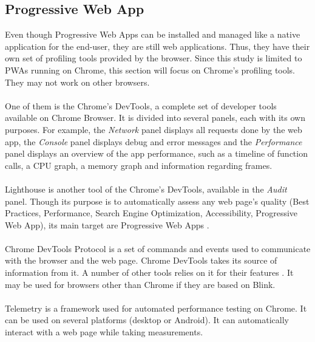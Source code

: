 \documentclass{kththesis}
\begin{document}
\subsection{Progressive Web App}

Even though Progressive Web Apps can be installed and managed like a native application for the end-user, they are still web applications. Thus, they have their own set of profiling tools provided by the browser. Since this study is limited to PWAs running on Chrome, this section will focus on Chrome's profiling tools. They may not work on other browsers.

\paragraph{}
One of them is the Chrome's DevTools, a complete set of developer tools available on Chrome Browser. It is divided into several panels, each with its own purposes. For example, the \textit{Network} panel displays all requests done by the web app, the \textit{Console} panel displays debug and error messages and the \textit{Performance} panel \cite{chrome_devtools_perf} displays an overview of the app performance, such as a timeline of function calls, a CPU graph, a memory graph and information regarding frames. 

\paragraph{}
Lighthouse \cite{lighthouse} is another tool of the Chrome's DevTools, available in the \textit{Audit} panel. Though its purpose is to automatically assess any web page's quality (Best Practices, Performance, Search Engine Optimization, Accessibility, Progressive Web App), its main target are Progressive Web Apps \cite{PWApossibleUnifer}. 

\paragraph{}
Chrome DevTools Protocol \cite{CDP} is a set of commands and events used to communicate with the browser and the web page. Chrome DevTools takes its source of information from it. A number of other tools relies on it for their features \cite{awesome_CDP}. It may be used for browsers other than Chrome if they are based on Blink.

\paragraph{}
Telemetry \cite{telemetry} is a framework used for automated performance testing on Chrome. It can be used on several platforms (desktop or Android). It can automatically interact with a web page while taking measurements. 
\end{document}
